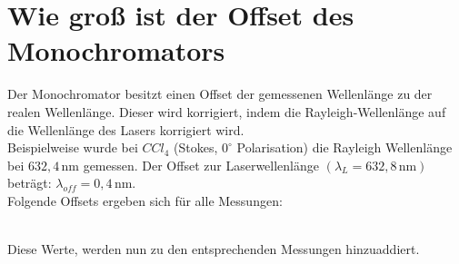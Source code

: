 \section{Wie groß ist der Offset des Monochromators}
Der Monochromator besitzt einen Offset der gemessenen Wellenlänge zu der realen Wellenlänge.
Dieser wird korrigiert, indem die Rayleigh-Wellenlänge auf die Wellenlänge des Lasers korrigiert wird.\\
Beispielweise wurde bei $CCl_4$ (Stokes, $0^\circ$ Polarisation) die Rayleigh Wellenlänge bei $632,4\,\text{nm}$ gemessen.
Der Offset zur Laserwellenlänge $\left(\lambda_L=632,8\,\text{nm}\right)$ beträgt: $\lambda_{off}=0,4\,\text{nm}$.\\

Folgende Offsets ergeben sich für alle Messungen:
\begin{table}[h]\begin{center}
    \hspace{1cm}
    \caption{Monochromator-Offset in (nm)}\end{center}
\end{table}\\
Diese Werte, werden nun zu den entsprechenden Messungen hinzuaddiert.